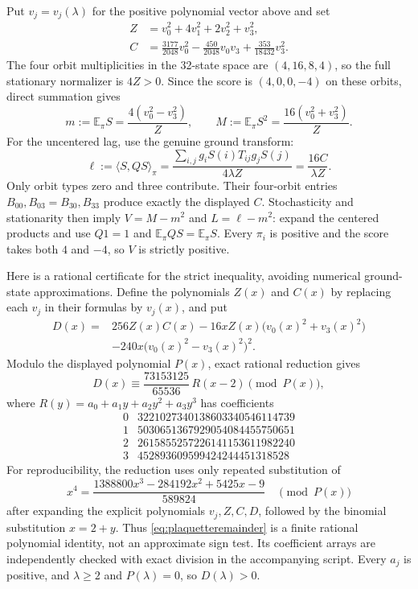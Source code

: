 \documentclass[11pt]{article}
\begin{document}
Put $v_j=v_j(\lambda)$ for the positive polynomial vector above and
set
\begin{align*}
 Z&=v_0^2+4v_1^2+2v_2^2+v_3^2,\\
 C&=\frac{3177}{2048}v_0^2
    -\frac{450}{2048}v_0v_3+\frac{353}{18432}v_3^2.
\end{align*}
The four orbit multiplicities in the 32-state space are $(4,16,8,4)$,
so the full stationary normalizer is $4Z>0$. Since the score is
$(4,0,0,-4)$ on these orbits, direct summation gives
\begin{equation}\label{eq:plaquettemoments}
 m:=\mathbb E_\pi S=\frac{4(v_0^2-v_3^2)}Z,\qquad
 M:=\mathbb E_\pi S^2=\frac{16(v_0^2+v_3^2)}Z.
\end{equation}
For the uncentered lag, use the genuine ground transform:
\[
 \ell:=\langle S,QS\rangle_\pi
 =\frac{\sum_{i,j}g_iS(i)T_{ij}g_jS(j)}{4\lambda Z}
 =\frac{16C}{\lambda Z}.
\]
Only orbit types zero and three contribute. Their four-orbit entries
$B_{00},B_{03}=B_{30},B_{33}$ produce exactly the displayed $C$.
Stochasticity and stationarity then imply
$V=M-m^2$ and $L=\ell-m^2$: expand the centered products and use
$Q1=1$ and $\mathbb E_\pi QS=\mathbb E_\pi S$.
Every $\pi_i$ is positive and the score takes both $4$ and $-4$,
so $V$ is strictly positive.

Here is a rational certificate for the strict inequality, avoiding
numerical ground-state approximations. Define the polynomials $Z(x)$
and $C(x)$ by replacing each $v_j$ in their formulas by $v_j(x)$, and
put
\begin{align*}
 D(x)={}&256Z(x)C(x)
 -16xZ(x)\bigl(v_0(x)^2+v_3(x)^2\bigr)\\
 &-240x\bigl(v_0(x)^2-v_3(x)^2\bigr)^2.
\end{align*}
Modulo the displayed polynomial $P(x)$, exact rational reduction gives
\begin{equation}\label{eq:plaquetteremainder}
 D(x)\equiv\frac{73153125}{65536}\,R(x-2)\pmod{P(x)},
\end{equation}
where $R(y)=a_0+a_1y+a_2y^2+a_3y^3$ has coefficients
\[
\begin{array}{c|r}
0&3221027340138603340546114739\\
1&5030651367929054084455750651\\
2&2615855257226141153611982240\\
3&452893609599424244451318528
\end{array}
\]
For reproducibility, the reduction uses only repeated substitution of
\[
 x^4=\frac{1388800x^3-284192x^2+5425x-9}{589824}
 \quad\pmod{P(x)}
\]
after expanding the explicit polynomials $v_j,Z,C,D$, followed by the
binomial substitution $x=2+y$. Thus \eqref{eq:plaquetteremainder}
is a finite rational polynomial identity, not an approximate sign test.
Its coefficient arrays are independently checked with exact division
in the accompanying script. Every $a_j$ is positive, and
$\lambda\geq2$ and $P(\lambda)=0$, so $D(\lambda)>0$.
\end{document}
